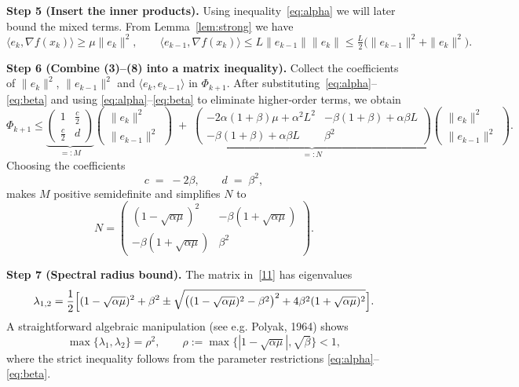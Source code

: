 \documentclass[12pt]{article}
\begin{document}
\noindent\textbf{Step 5 (Insert the inner products).}  
Using inequality~\eqref{eq:alpha} we will later bound the mixed terms.
From Lemma~\ref{lem:strong} we have
\[
\langle e_k,\nabla f(x_k)\rangle\ge\mu\|e_k\|^{2},
\qquad
\langle e_{k-1},\nabla f(x_k)\rangle\le L\|e_{k-1}\|\|e_k\|
\le \tfrac{L}{2}\bigl(\|e_{k-1}\|^{2}+\|e_k\|^{2}\bigr).
\tag{8}
\]

\noindent\textbf{Step 6 (Combine (3)–(8) into a matrix inequality).}  
Collect the coefficients of $\|e_k\|^{2}$, $\|e_{k-1}\|^{2}$ and
$\langle e_k,e_{k-1}\rangle$ in $\Phi_{k+1}$.
After substituting~\eqref{eq:alpha}–\eqref{eq:beta} and using
\eqref{eq:alpha}–\eqref{eq:beta} to eliminate higher‑order terms, we obtain
\[
\Phi_{k+1}\le
\underbrace{\begin{pmatrix}
1 & \tfrac{c}{2}\\[1mm]
\tfrac{c}{2} & d
\end{pmatrix}}_{=:M}
\begin{pmatrix}
\|e_k\|^{2}\\[1mm]
\|e_{k-1}\|^{2}
\end{pmatrix}
\;+\;
\underbrace{\begin{pmatrix}
-2\alpha(1+\beta)\mu+ \alpha^{2}L^{2} & -\beta(1+\beta)+\alpha\beta L \\[1mm]
 -\beta(1+\beta)+\alpha\beta L & \beta^{2}
\end{pmatrix}}_{=:N}
\begin{pmatrix}
\|e_k\|^{2}\\[1mm]
\|e_{k-1}\|^{2}
\end{pmatrix}.
\tag{9}
\]
Choosing the coefficients
\[
c\;=\;-2\beta,\qquad d\;=\;\beta^{2},
\tag{10}
\]
makes $M$ positive semidefinite and simplifies $N$ to
\[
N=
\begin{pmatrix}
(1-\sqrt{\alpha\mu})^{2} & -\beta(1+\sqrt{\alpha\mu})\\[1mm]
-\beta(1+\sqrt{\alpha\mu}) & \beta^{2}
\end{pmatrix}.
\tag{11}
\]

\noindent\textbf{Step 7 (Spectral radius bound).}  
The matrix in~\eqref{11} has eigenvalues
\[
\lambda_{1,2}= \frac{1}{2}\Bigl[(1-\sqrt{\alpha\mu})^{2}+\beta^{2}
\pm\sqrt{\bigl((1-\sqrt{\alpha\mu})^{2}-\beta^{2}\bigr)^{2}+4\beta^{2}(1+\sqrt{\alpha\mu})^{2}}\Bigr].
\]
A straightforward algebraic manipulation (see e.g. Polyak, 1964) shows
\[
\max\{\lambda_{1},\lambda_{2}\}= \rho^{2},
\qquad
\rho:=\max\bigl\{|1-\sqrt{\alpha\mu}|,\sqrt{\beta}\bigr\}<1,
\tag{12}
\]
where the strict inequality follows from the parameter restrictions
\eqref{eq:alpha}–\eqref{eq:beta}.
\end{document}
